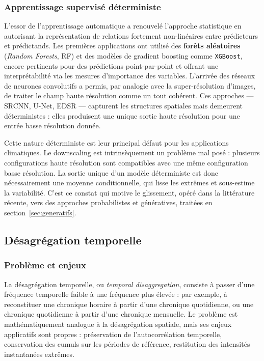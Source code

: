 \documentclass[14pt,a4paper,openany]{extreport}
\theoremstyle{definition}
\begin{document}
\subsubsection{Apprentissage supervisé déterministe}

L'essor de l'apprentissage automatique a renouvelé l'approche statistique en autorisant la représentation de relations fortement non-linéaires entre prédicteurs et prédictands. Les premières applications ont utilisé des \textbf{forêts aléatoires} (\emph{Random Forests}, RF) et des modèles de gradient boosting comme \texttt{XGBoost}, encore pertinents pour des prédictions point-par-point et offrant une interprétabilité via les mesures d'importance des variables. L'arrivée des réseaux de neurones convolutifs a permis, par analogie avec la super-résolution d'images, de traiter le champ haute résolution comme un tout cohérent. Ces approches --- SRCNN, U-Net, EDSR --- capturent les structures spatiales mais demeurent déterministes : elles produisent une unique sortie haute résolution pour une entrée basse résolution donnée.

Cette nature déterministe est leur principal défaut pour les applications climatiques. Le downscaling est intrinsèquement un problème mal posé : plusieurs configurations haute résolution sont compatibles avec une même configuration basse résolution. La sortie unique d'un modèle déterministe est donc nécessairement une moyenne conditionnelle, qui lisse les extrêmes et sous-estime la variabilité. C'est ce constat qui motive le glissement, opéré dans la littérature récente, vers des approches probabilistes et génératives, traitées en section~\ref{sec:generatifs}.

\subsection{Désagrégation temporelle}
\label{ssec:disagg-temporelle}

\subsubsection{Problème et enjeux}

La désagrégation temporelle, ou \emph{temporal disaggregation}, consiste à passer d'une fréquence temporelle faible à une fréquence plus élevée : par exemple, à reconstituer une chronique horaire à partir d'une chronique quotidienne, ou une chronique quotidienne à partir d'une chronique mensuelle. Le problème est mathématiquement analogue à la désagrégation spatiale, mais ses enjeux applicatifs sont propres : préservation de l'autocorrélation temporelle, conservation des cumuls sur les périodes de référence, restitution des intensités instantanées extrêmes.
\end{document}
